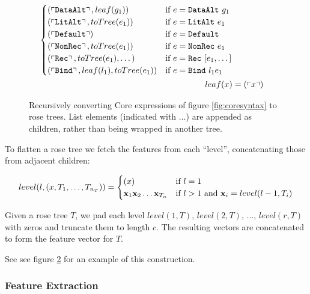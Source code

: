 \begin{figure}
\begin{align*}
\begin{cases}
      (\feature{\CDataAlt}, leaf(g_1))                              & \text{if $e = \CDataAlt\ g_1$}  \\
      (\feature{\CLitAlt}, toTree(e_1))                             & \text{if $e = \CLitAlt\ e_1$}  \\
      (\feature{\CDefault})                                         & \text{if $e = \CDefault$}  \\
      (\feature{\CNonRec}, toTree(e_1))                             & \text{if $e = \CNonRec\ e_1$}  \\
      (\feature{\CRec}, toTree(e_1), \dots)                         & \text{if $e = \CRec\ [e_1, \dots]$} \\
      (\feature{\CBind}, leaf(l_1), toTree(e_1))                    & \text{if $e = \CBind\ l_1 e_1$}
    \end{cases} \\
    leaf(x) &= (\feature{x})
  \end{align*}
  \caption{Recursively converting Core expressions of figure \ref{fig:coresyntax} to rose trees. List elements (indicated with $\dots$) are appended as children, rather than being wrapped in another tree.}
  \label{fig:totree}
\end{figure}

To flatten a rose tree we fetch the features from each ``level'', concatenating those from adjacent children:

\begin{equation*}
  level(l, (x, T_1, \dots, T_{n_T})) =
    \begin{cases}
      (x) & \text{if $l = 1$} \\
      \mathbf{x}_1 \mathbf{x}_2 \dots \mathbf{x}_{T_n} & \text{if $l > 1$ and $\mathbf{x}_i = level(l - 1, T_i)$}
    \end{cases}
\end{equation*}

Given a rose tree $T$, we pad each level $level(1, T)$, $level(2, T)$, $\dots$, $level(r, T)$ with zeros and truncate them to length $c$. The resulting vectors are concatenated to form the feature vector for $T$.

See see figure \ref{fig:rosetreeexample} for an example of this construction.

\begin{figure}
  \caption{}
  \label{fig:rosetreeexample}
\end{figure}

\subsubsection{Feature Extraction}

